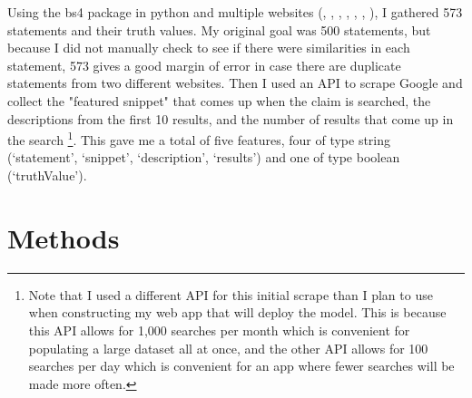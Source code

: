 \documentclass[]{article}
\begin{document}
			
		Using the bs4 package in python and multiple websites (\cite{tf1}, \cite{tf2}, \cite{tf3}, \cite{tf4}, \cite{tf5}, \cite{tf6}, \cite{tf7}), I gathered 573 statements and their truth values. My original goal was 500 statements, but because I did not manually check to see if there were similarities in each statement, 573 gives a good margin of error in case there are duplicate statements from two different websites. Then I used an API to scrape Google and collect the "featured snippet" that comes up when the claim is searched, the descriptions from the first 10 results, and the number of results that come up in the search \cite{a_api} \footnote{Note that I used a different API for this initial scrape than I plan to use when constructing my web app that will deploy the model. This is because this API allows for 1,000 searches per month which is convenient for populating a large dataset all at once, and the other API allows for 100 searches per day which is convenient for an app where fewer searches will be made more often.}. This gave me a total of five features, four of type string (`statement', `snippet', `description', `results') and one of type boolean (`truthValue').
		
	\section{Methods}
		
		
		
		
\end{document}
